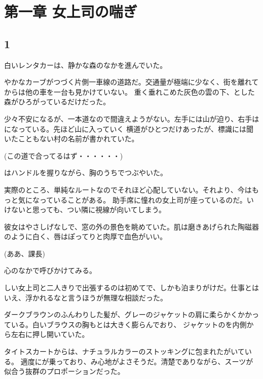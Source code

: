 ﻿\documentclass[book,tate]{jlreq}
\begin{document}

\chapter{第一章 女上司の喘ぎ}

\section*{1}

白いレンタカーは、静かな森のなかを進んでいた。

やかなカーブがつづく片側一車線の道路だ。交通量が極端に少なく、街を離れてからは他の車を一台も見かけていない。
重く垂れこめた灰色の雲の下、とした森がひろがっているだけだった。

少々不安になるが、一本道なので間違えようがない。左手には山が迫り、右手はになっている。先ほど山に入っていく
横道がひとつだけあったが、標識には聞いたこともない村の名前が書かれていた。

(この道で合ってるはず・・・・・・)

はハンドルを握りながら、胸のうちでつぶやいた。

実際のところ、単純なルートなのでそれほど心配していない。それより、今はもっと気になっていることがある。
助手席に憧れの女上司が座っているのだ。いけないと思っても、つい隣に視線が向いてしまう。

彼女はやさしげなしで、窓の外の景色を眺めていた。肌は磨きあげられた陶磁器のように白く、唇はぽってりと肉厚で血色がいい。

(ああ、課長)

心のなかで呼びかけてみる。

しい女上司と二人きりで出張するのは初めてで、しかも泊まりがけだ。仕事とはいえ、浮かれるなと言うほうが無理な相談だった。

ダークブラウンのふんわりした髪が、グレーのジャケットの肩に柔らかくかかっている。白いブラウスの胸もとは大きく膨らんでおり、
ジャケットのを内側から左右に押し開いていた。

タイトスカートからは、ナチュラルカラーのストッキングに包まれたがいている。
適度にが乗っており、み心地がよさそうだ。清楚でありながら、スーツが似合う抜群のプロポーションだった。
\end{document}
